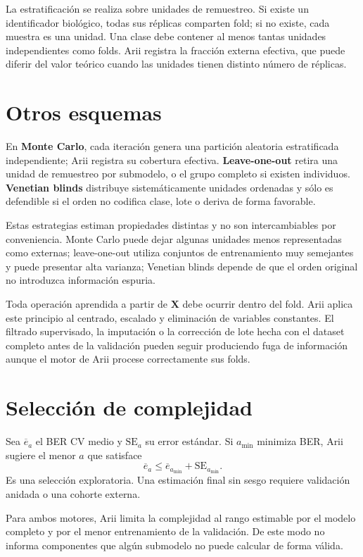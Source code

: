 \documentclass[11pt,a4paper,openany]{report}
\newcommand{\vect}[1]{\boldsymbol{#1}}
\begin{document}
La estratificación se realiza sobre unidades de remuestreo. Si existe un identificador biológico, todas sus réplicas comparten fold; si no existe, cada muestra es una unidad. Una clase debe contener al menos tantas unidades independientes como folds. Arii registra la fracción externa efectiva, que puede diferir del valor teórico cuando las unidades tienen distinto número de réplicas.

\section{Otros esquemas}
En \textbf{Monte Carlo}, cada iteración genera una partición aleatoria estratificada independiente; Arii registra su cobertura efectiva.
\textbf{Leave-one-out} retira una unidad de remuestreo por submodelo, o el grupo completo si existen individuos. \textbf{Venetian blinds} distribuye sistemáticamente unidades ordenadas y sólo es defendible si el orden no codifica clase, lote o deriva de forma favorable.

Estas estrategias estiman propiedades distintas y no son intercambiables por conveniencia. Monte Carlo puede dejar algunas unidades menos representadas como externas; leave-one-out utiliza conjuntos de entrenamiento muy semejantes y puede presentar alta varianza; Venetian blinds depende de que el orden original no introduzca información espuria.

Toda operación aprendida a partir de $\vect{X}$ debe ocurrir dentro del fold.
Arii aplica este principio al centrado, escalado y eliminación de variables constantes. El filtrado supervisado, la imputación o la corrección de lote hecha con el dataset completo antes de la validación pueden seguir produciendo fuga de información aunque el motor de Arii procese correctamente sus folds.

\section{Selección de complejidad}
Sea $\overline{e}_{a}$ el BER CV medio y $\mathrm{SE}_{a}$ su error estándar. Si $a_{\min}$ minimiza BER, Arii sugiere el menor $a$ que satisface
\begin{equation}
  \overline{e}_{a}\leq
  \overline{e}_{a_{\min}}+\mathrm{SE}_{a_{\min}}.
\end{equation}
Es una selección exploratoria. Una estimación final sin sesgo requiere validación anidada o una cohorte externa.

Para ambos motores, Arii limita la complejidad al rango estimable por el modelo completo y por el menor entrenamiento de la validación. De este modo no informa componentes que algún submodelo no puede calcular de forma válida.
\end{document}
